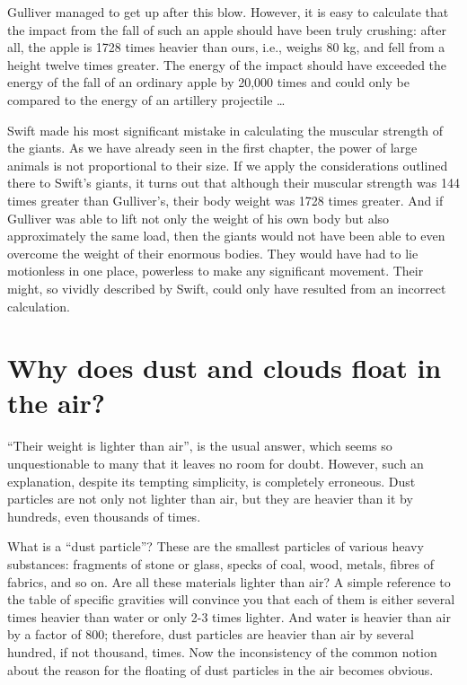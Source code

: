 Gulliver managed to get up after this blow. However, it is easy to calculate that the impact from the fall of such an apple should have been truly crushing: after all, the apple is 1728 times heavier than ours, i.e., weighs 80 kg, and fell from a height twelve times greater. The energy of the impact should have exceeded the energy of the fall of an ordinary apple by 20,000 times and could only be compared to the energy of an artillery projectile \dots{}

Swift made his most significant mistake in calculating the muscular strength of the giants. As we have already seen in the first chapter, the power of large animals is not proportional to their size. If we apply the considerations outlined there to Swift's giants, it turns out that although their muscular strength was 144 times greater than Gulliver's, their body weight was 1728 times greater. And if Gulliver was able to lift not only the weight of his own body but also approximately the same load, then the giants would not have been able to even overcome the weight of their enormous bodies. They would have had to lie motionless in one place, powerless to make any significant movement. Their might, so vividly described by Swift, could only have resulted from an incorrect calculation.

\section{Why does dust and clouds float in the air?}
\label{sec-11.15}

``Their weight is lighter than air'', is the usual answer, which seems so unquestionable to many that it leaves no room for doubt. However, such an explanation, despite its tempting simplicity, is completely erroneous. Dust particles are not only not lighter than air, but they are heavier than it by hundreds, even thousands of times.

What is a ``dust particle''? These are the smallest particles of various heavy substances: fragments of stone or glass, specks of coal, wood, metals, fibres of fabrics, and so on. Are all these materials lighter than air? A simple reference to the table of specific gravities will convince you that each of them is either several times heavier than water or only 2-3 times lighter. And water is heavier than air by a factor of 800; therefore, dust particles are heavier than air by several hundred, if not thousand, times. Now the inconsistency of the common notion about the reason for the floating of dust particles in the air becomes obvious.

